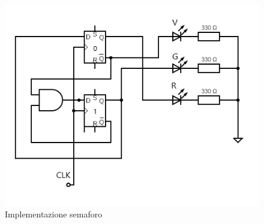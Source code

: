 \documentclass[10pt,a4paper]{article}
\begin{document}
\begin{figure}[h]

			\centering

			\includegraphics[scale=0.8]{circuit}

			\caption{Implementazione semaforo}

			\label{fig:circ}

\end{figure}
\end{document}
